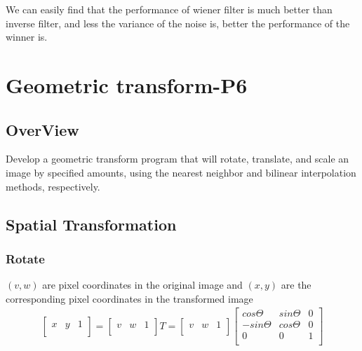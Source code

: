 \documentclass[11pt,oneside]{book}
\begin{document}
We can easily find that the performance of wiener filter is much better than inverse filter, and less the variance of the noise is, better the performance of the winner is.
\chapter{Geometric transform-P6}
\section{OverView}
Develop a geometric transform program that will rotate, translate, and scale an image by specified amounts, using the nearest neighbor and bilinear interpolation methods, respectively.

\section{Spatial Transformation}
\subsection{Rotate}
$(v, w)$ are pixel coordinates in the original image and $(x, y)$ are the corresponding pixel coordinates in the transformed image
\begin{align}
\left[               
  \begin{array}{ccc}  
    x & y & 1\\ 
  \end{array}
\right] 
=
\left[               
  \begin{array}{ccc}  
    v & w & 1\\ 
  \end{array}
\right]
T
=
\left[               
  \begin{array}{ccc}  
    v & w & 1\\ 
  \end{array}
\right]
\left[               
  \begin{array}{ccc}  
    cos\Theta & sin\Theta & 0\\
    -sin\Theta & cos\Theta & 0\\
    0 & 0 & 1\\ 
  \end{array}
\right]
\end{align}
\end{document}
